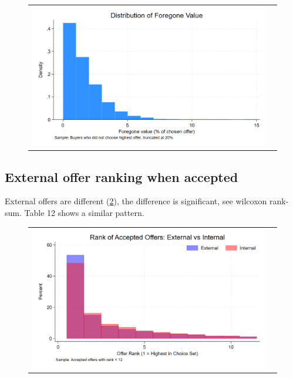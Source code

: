 \documentclass[12pt]{article}
\begin{document}
  \begin{figure}[H]
\caption{}
 \label{fig:ie4_11}
\centering{}%
\begin{tabular}{cc}
\includegraphics[scale=0.27]{../figures/IE4/IE4_foregone_distribution.png} 
\end{tabular}
\end{figure} 





\newpage

\subsection{External offer ranking when accepted}

External offers are different (\ref{fig:ie4_11}), the difference is significant, see wilcoxon rank-sum. Table 12 shows a similar pattern. 
\begin{figure}[H]
\caption{}
\label{fig:ie4_11}
\centering{}%
\begin{tabular}{cc}
\includegraphics[scale=0.27]{../figures/IE4/IE4_rank_of_accepted_external.png} 
\end{tabular}
\end{figure} 
\end{document}
